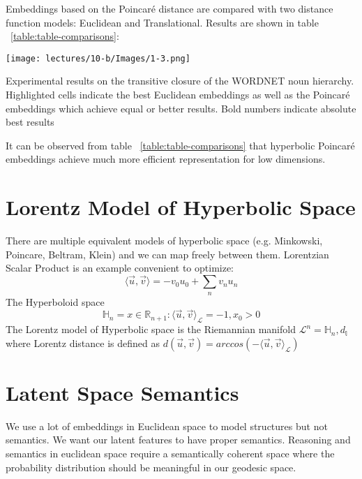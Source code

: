 Embeddings based on the Poincaré distance are compared with two distance function models: Euclidean and Translational. Results are shown in table ~\ref{table:table-comparisons}:

\begin{table}[htb]
  \centering
    \texttt{[image: lectures/10-b/Images/1-3.png]}
    \caption{Experimental results on the transitive closure of the WORDNET noun hierarchy. Highlighted cells indicate the best Euclidean embeddings as well as the Poincaré embeddings which achieve equal or better results. Bold numbers indicate absolute best results}
    \label{table:table-comparisons}
\end{table}

It can be observed from table  ~\ref{table:table-comparisons} that hyperbolic Poincaré embeddings achieve much more efficient representation for low dimensions. 

\section{Lorentz Model of Hyperbolic Space}

There are multiple equivalent models of hyperbolic space (e.g. Minkowski, Poincare, Beltram, Klein) and we can map freely between them. Lorentzian Scalar Product is an example convenient to optimize:
\begin{equation} \label{eq:riemmaniansdg3}
         \langle \vec{u},\vec{v} \rangle = -v_0 u_0 + \sum_n v_n u_n
\end{equation}  
The Hyperboloid space 
\begin{equation} \label{eq:riemmaniansdg4}
         \mathbb{H}_n = {x \in \mathbb{R}_{n+1}:\langle \vec{u},\vec{v} \rangle_{ \mathcal{L}}= -1, x_0 > 0 }
\end{equation}  
The Lorentz model of Hyperbolic space is the Riemannian manifold  $\mathcal{L}^n =  \mathbb{H}_n , d_{\mathbb{l}}$
where Lorentz distance is defined as $d(\vec{u},\vec{v}) = arccos (-\langle \vec{u},\vec{v} \rangle_{ \mathcal{L}}) $

\section{Latent Space Semantics}

We use a lot of embeddings in Euclidean space to model structures but not semantics. We want our latent features to have proper semantics. Reasoning and semantics in euclidean space require a semantically coherent space where the probability distribution should be meaningful in our geodesic space.  

